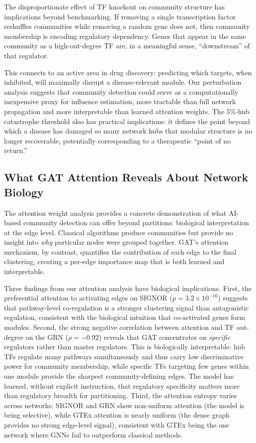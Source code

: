 \documentclass[11pt]{article}
\begin{document}
The disproportionate effect of TF knockout on community structure has implications beyond benchmarking.
If removing a single transcription factor reshuffles communities while removing a random gene does not, then community membership is encoding regulatory dependency.
Genes that appear in the same community as a high-out-degree TF are, in a meaningful sense, ``downstream'' of that regulator.

This connects to an active area in drug discovery: predicting which targets, when inhibited, will maximally disrupt a disease-relevant module.
Our perturbation analysis suggests that community detection could serve as a computationally inexpensive proxy for influence estimation, more tractable than full network propagation and more interpretable than learned attention weights.
The 5\%-hub catastrophe threshold also has practical implications: it defines the point beyond which a disease has damaged so many network hubs that modular structure is no longer recoverable, potentially corresponding to a therapeutic ``point of no return.''

\subsection{What GAT Attention Reveals About Network Biology}

The attention weight analysis provides a concrete demonstration of what AI-based community detection can offer beyond partitions: biological interpretation at the edge level.
Classical algorithms produce communities but provide no insight into \emph{why} particular nodes were grouped together.
GAT's attention mechanism, by contrast, quantifies the contribution of each edge to the final clustering, creating a per-edge importance map that is both learned and interpretable.

Three findings from our attention analysis have biological implications.
First, the preferential attention to activating edges on SIGNOR ($p = 3.2 \times 10^{-16}$) suggests that pathway-level co-regulation is a stronger clustering signal than antagonistic regulation, consistent with the biological intuition that co-activated genes form modules.
Second, the strong negative correlation between attention and TF out-degree on the GRN ($\rho = -0.92$) reveals that GAT concentrates on \emph{specific} regulators rather than master regulators.
This is biologically interpretable: hub TFs regulate many pathways simultaneously and thus carry low discriminative power for community membership, while specific TFs targeting few genes within one module provide the sharpest community-defining edges.
The model has learned, without explicit instruction, that regulatory specificity matters more than regulatory breadth for partitioning.
Third, the attention entropy varies across networks: SIGNOR and GRN show non-uniform attention (the model is being selective), while GTEx attention is nearly uniform (the dense graph provides no strong edge-level signal), consistent with GTEx being the one network where GNNs fail to outperform classical methods.
\end{document}
